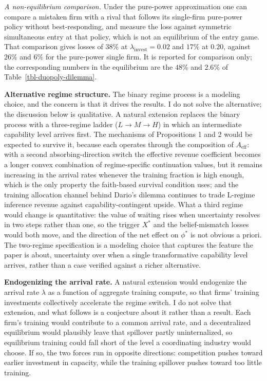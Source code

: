 \documentclass[
  11pt,
  letterpaper,
]{scrartcl}
\begin{document}
\emph{A non-equilibrium comparison.} Under the pure-power approximation
one can compare a mistaken firm with a rival that follows its
single-firm pure-power policy without best-responding, and measure the
loss against symmetric simultaneous entry at that policy, which is not
an equilibrium of the entry game. That comparison gives losses of
\(38\%\) at \(\lambda_{\text{invest}} = 0.02\) and \(17\%\) at \(0.20\),
against \(26\%\) and \(6\%\) for the pure-power single firm. It is
reported for comparison only; the corresponding numbers in the
equilibrium are the \(48\%\) and \(2.6\%\) of
Table~\ref{tbl-duopoly-dilemma}.

\textbf{Alternative regime structure.} The binary regime process is a
modeling choice, and the concern is that it drives the results. I do not
solve the alternative; the discussion below is qualitative. A natural
extension replaces the binary process with a three-regime ladder
(\(L \to M \to H\)) in which an intermediate capability level arrives
first. The mechanisms of Propositions 1 and 2 would be expected to
survive it, because each operates through the composition of
\(A_{\text{eff}}\): with a second absorbing-direction switch the
effective revenue coefficient becomes a longer convex combination of
regime-specific continuation values, but it remains increasing in the
arrival rates whenever the training fraction is high enough, which is
the only property the faith-based survival condition uses; and the
training allocation channel behind Dario's dilemma continues to trade
L-regime inference revenue against capability-contingent upside. What a
third regime would change is quantitative: the value of waiting rises
when uncertainty resolves in two steps rather than one, so the trigger
\(X^*\) and the belief-mismatch losses would both move, and the
direction of the net effect on \(\phi^*\) is not obvious a priori. The
two-regime specification is a modeling choice that captures the feature
the paper is about, uncertainty over when a single transformative
capability level arrives, rather than a case verified against a richer
alternative.

\textbf{Endogenizing the arrival rate.} A natural extension would
endogenize the arrival rate \(\lambda\) as a function of aggregate
training compute, so that firms' training investments collectively
accelerate the regime switch. I do not solve that extension, and what
follows is a conjecture about it rather than a result. Each firm's
training would contribute to a common arrival rate, and a decentralized
equilibrium would plausibly leave that spillover partly uninternalized,
so equilibrium training could fall short of the level a coordinating
industry would choose. If so, the two forces run in opposite directions:
competition pushes toward earlier investment in capacity, while the
training spillover pushes toward too little training.
\end{document}
